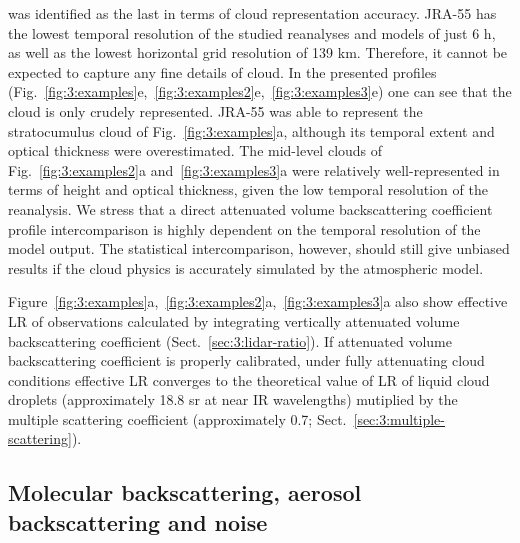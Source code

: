 was identified as the last in terms of cloud representation accuracy. JRA-55
has the lowest temporal resolution of the studied reanalyses and models of
just 6 h, as well as the lowest horizontal grid resolution of 139 km. Therefore,
it cannot be expected to capture any fine details of cloud. In the presented
profiles (Fig.~\ref{fig:3:examples}e,~\ref{fig:3:examples2}e,~\ref{fig:3:examples3}e) one can see that the cloud is only
crudely represented. JRA-55 was able to represent the stratocumulus cloud
of Fig.~\ref{fig:3:examples}a, although its temporal extent and optical thickness
were overestimated. The mid-level clouds of Fig.~\ref{fig:3:examples2}a and~\ref{fig:3:examples3}a were
relatively well-represented in terms of height and optical thickness,
given the low temporal resolution of the reanalysis.
We stress that a direct attenuated volume backscattering coefficient profile intercomparison is highly dependent
on the temporal resolution of the model output. The statistical intercomparison,
however, should still give unbiased results if the cloud physics is accurately
simulated by the atmospheric model.

Figure~\ref{fig:3:examples}a,~\ref{fig:3:examples2}a,~\ref{fig:3:examples3}a also
show effective LR of observations calculated by integrating vertically
attenuated volume backscattering coefficient (Sect.~\ref{sec:3:lidar-ratio}).
If attenuated volume backscattering coefficient is properly calibrated,
under fully attenuating cloud
conditions effective LR converges to the theoretical value of LR
of liquid cloud droplets
(approximately 18.8 sr at near IR wavelengths) mutiplied by the multiple
scattering coefficient (approximately 0.7; Sect.~\ref{sec:3:multiple-scattering}).

\subsection{Molecular backscattering, aerosol backscattering and noise}

